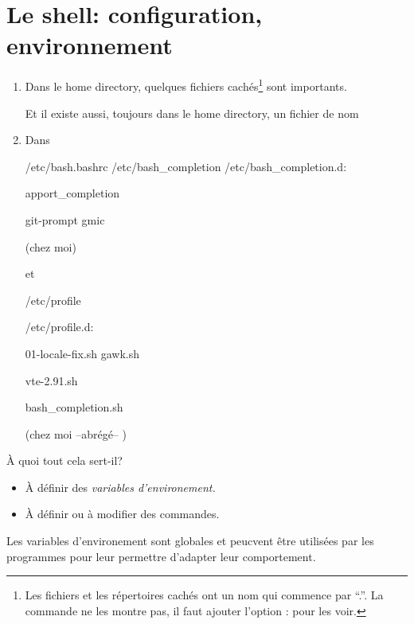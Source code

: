 \section{Le shell: configuration, environnement}
\begin{enumerate}
\item Dans le home directory, quelques fichiers cachés\footnote{Les
  fichiers et les répertoires cachés ont un nom qui commence par ``.''.
  La commande  ne les montre pas, il faut ajouter l'option
  :  pour les voir.} sont importants.

  

Et il existe aussi, toujours dans le home directory, un fichier de nom

\item
  Dans 

  {
/etc/bash.bashrc  /etc/bash\_completion
/etc/bash\_completion.d:

apport\_completion

git-prompt  gmic
  }{(chez moi)}
  
  et

{
/etc/profile

/etc/profile.d:

01-locale-fix.sh gawk.sh

vte-2.91.sh

bash\_completion.sh


}{(chez moi --abrégé-- )}


\end{enumerate}

\`A quoi tout cela sert-il?
\begin{itemize}

\item \`A définir des \emph{variables d'environement.}
\item \`A définir ou à modifier des commandes.
\end{itemize}

Les variables d'environement sont globales et peucvent être utilisées
par les programmes pour leur permettre d'adapter leur comportement.
